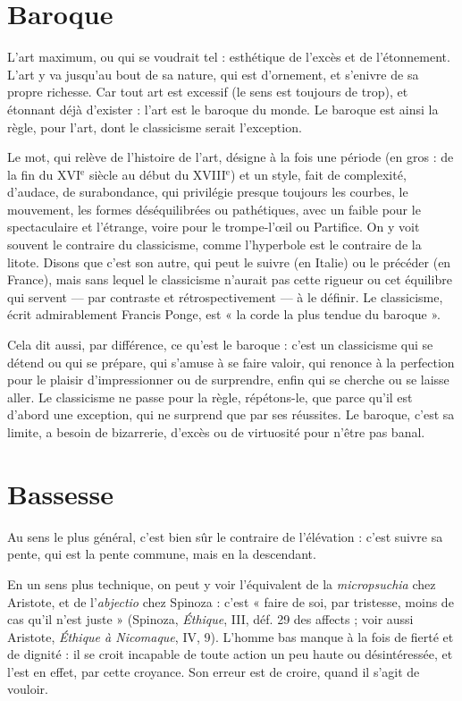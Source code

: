 \section{Baroque}
L’art maximum, ou qui se voudrait tel : esthétique de l’excès et
de l’étonnement. L’art y va jusqu’au bout de sa nature, qui est
d'ornement, et s’enivre de sa propre richesse. Car tout art est excessif (le sens
est toujours de trop), et étonnant déjà d’exister : l’art est le baroque du monde.
Le baroque est ainsi la règle, pour l’art, dont le classicisme serait l'exception.

Le mot, qui relève de l’histoire de l’art, désigne à la fois une période (en gros :
de la fin du {\footnotesize XVI$^\text{e}$} siècle au début du {\footnotesize XVIII$^\text{e}$}) et un style, fait de complexité, d’audace,
de surabondance, qui privilégie presque toujours les courbes, le mouvement, les
formes déséquilibrées ou pathétiques, avec un faible pour le spectaculaire et
l'étrange, voire pour le trompe-l’œil ou Partifice. On y voit souvent le contraire
du classicisme, comme l’hyperbole est le contraire de la litote. Disons que c’est
son autre, qui peut le suivre (en Italie) ou le précéder (en France), mais sans
lequel le classicisme n’aurait pas cette rigueur ou cet équilibre qui servent — par
contraste et rétrospectivement — à le définir. Le classicisme, écrit admirablement
Francis Ponge, est « la corde la plus tendue du baroque ».

Cela dit aussi, par différence, ce qu’est le baroque : c’est un classicisme qui
se détend ou qui se prépare, qui s’amuse à se faire valoir, qui renonce à la perfection
pour le plaisir d’impressionner ou de surprendre, enfin qui se cherche
ou se laisse aller. Le classicisme ne passe pour la règle, répétons-le, que parce
qu'il est d’abord une exception, qui ne surprend que par ses réussites. Le
baroque, c’est sa limite, a besoin de bizarrerie, d’excès ou de virtuosité pour
n'être pas banal.

\section{Bassesse}
Au sens le plus général, c’est bien sûr le contraire de l'élévation :
c’est suivre sa pente, qui est la pente commune, mais en la descendant.

En un sens plus technique, on peut y voir l’équivalent de la {\it micropsuchia}
chez Aristote, et de l’{\it abjectio} chez Spinoza : c’est « faire de soi, par tristesse,
moins de cas qu’il n’est juste » (Spinoza, {\it Éthique}, III, déf. 29 des affects ; voir
aussi Aristote, {\it Éthique à Nicomaque}, IV, 9). L'homme bas manque à la fois de
fierté et de dignité : il se croit incapable de toute action un peu haute ou désintéressée,
et l’est en effet, par cette croyance. Son erreur est de croire, quand il
s’agit de vouloir.

